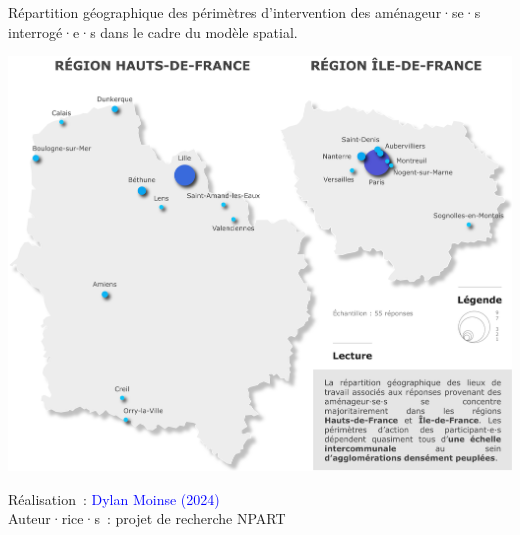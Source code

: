 \begin{refsegment}
    \begin{carte}[h!]\vspace*{4pt}
        \caption{Répartition géographique des périmètres d’intervention des aménageur·se·s interrogé·e·s dans le cadre du modèle spatial.}
        \label{fig-chap6:localisation-travail-amenageurs-interroges}
        \centerline{\includegraphics[width=1\columnwidth]{src/Figures/Chap-6/FR_NPART_Carte_lieu_travail_urbanistes.pdf}}
        \vspace{5pt}
        \begin{flushright}\scriptsize{
        Réalisation~: \textcolor{blue}{Dylan Moinse (2024)}
        \\
        Auteur·rice·s~: projet de recherche \acrshort{NPART}
        }\end{flushright}
    \end{carte}


\end{refsegment}
